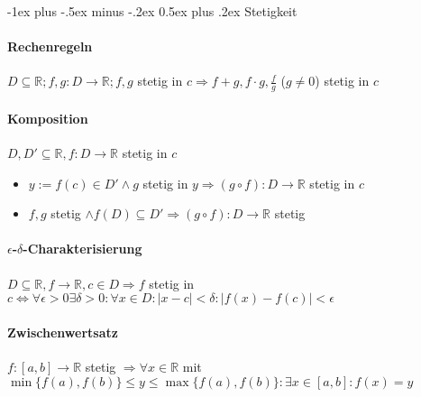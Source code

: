 \documentclass[paper=a4,paper=landscape, fontsize=6pt,DIV=25, twoside]{scrartcl}
\makeatletter
\newcommand{\real}{{\mathbb{R}}}
\renewcommand{\section}{\@startsection{section}{1}{0mm}%
                                {-1ex plus -.5ex minus -.2ex}%
                                {0.5ex plus .2ex}%
                                {\normalfont\large\bfseries}}
\makeatother
\begin{document}
\begin{multicols*}{4}
		\section{Stetigkeit}
			\paragraph{Rechenregeln}
			$D \subseteq \real;f,g: D \rightarrow \real;f,g$ stetig in $c \Rightarrow f+g, f \cdot g,\frac{f}{g}$ ($g \neq 0$) stetig in $c$
			\paragraph{Komposition}
			$D,D' \subseteq \real, f:D \rightarrow \real$ stetig in $c$
			\begin{itemize}
				\item $y := f(c) \in D' \wedge g $ stetig in $y \Rightarrow (g \circ f): D \rightarrow \real$ stetig in $c$
				\item $f,g$ stetig $\wedge f(D) \subseteq D' \Rightarrow (g \circ f): D \rightarrow \real$ stetig
			\end{itemize}
			\paragraph{$\epsilon$-$\delta$-Charakterisierung}
			$D \subseteq \real, f \rightarrow \real, c \in D \Rightarrow f$ stetig in $c \Leftrightarrow \forall \epsilon > 0 \exists \delta > 0: \forall x \in D: \lvert x - c \rvert < \delta: \lvert f(x)-f(c)\rvert < \epsilon$
			\paragraph{Zwischenwertsatz}
			$f:[a,b] \rightarrow \real$ stetig $\Rightarrow \forall x \in \real$ mit $ \min\{f(a),f(b)\} \leq y \leq \max\{f(a), f(b)\}: \exists x \in [a,b]: f(x)=y$

\end{multicols*}
\end{document}
